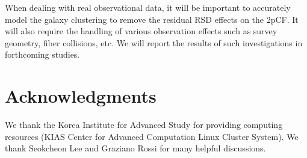 \documentclass[useAMS,usenatbib]{mn2e}
\begin{document}
When dealing with real observational data, 
it will be important to accurately model the galaxy clustering to remove the residual RSD effects on the 2pCF.
It will also require the handling of various observation effects such as survey geometry, fiber collisions, etc. 
We will report the results of such investigations in forthcoming studies.

\section*{Acknowledgments}

We thank the Korea Institute for Advanced Study for providing computing resources (KIAS Center for Advanced Computation Linux Cluster System).
We thank Seokcheon Lee and Graziano Rossi for many helpful discussions.
\end{document}
